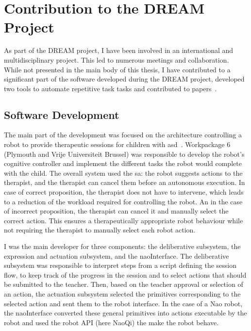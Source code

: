 \cleartooddpage
\chapter{Contribution to the DREAM Project} \label{app:dream}
\glsresetall

As part of the DREAM project, I have been involved in an international and multidisciplinary project. This led to numerous meetings and collaboration. While not presented in the main body of this thesis, I have contributed to a significant part of the software developed during the DREAM project, developed two tools to automate repetitive task tasks and contributed to papers~\citep{esteban2017build,cao2018personalized}.

\section{Software Development}

The main part of the development was focused on the architecture controlling a robot to provide therapeutic sessions for children with \gls{asd}~\citep{esteban2017build}. Workpackage 6 (Plymouth and Vrije Universiteit Brussel) was responsible to develop the robot's cognitive controller and implement the different tasks the robot would complete with the child. The overall system used the \gls{sa}: the robot suggests actions to the therapist, and the therapist can cancel them before an autonomous execution. In case of correct proposition, the therapist does not have to intervene, which leads to a reduction of the workload required for controlling the robot. An in the case of incorrect proposition, the therapist can cancel it and manually select the correct action. This ensures a therapeutically appropriate robot behaviour while not requiring the therapist to manually select each robot action. 

I was the main developer for three components: the deliberative subsystem, the expression and actuation subsystem, and the naoInterface. The deliberative subsystem was responsible to interpret steps from a script defining the session flow, to keep track of the progress in the session and to select actions that should be submitted to the teacher. Then, based on the teacher approval or selection of an action, the actuation subsystem selected the primitives corresponding to the selected  action and sent them to the robot interface. In the case of a Nao robot, the naoInterface converted these general primitives into actions executable by the robot and used the robot API (here NaoQi) the make the robot behave. 

